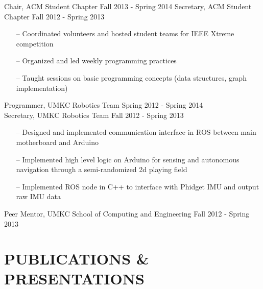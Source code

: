\documentclass[line,margin]{res}
\begin{document}
\begin{resume}
		
		
		Chair, ACM Student Chapter \hfill Fall 2013 - Spring 2014
		Secretary, ACM Student Chapter \hfill Fall 2012 - Spring 2013 
		         \begin{itemize} [leftmargin=5mm]  \itemsep -2pt %
                 \item[--] Coordinated volunteers and hosted student teams for IEEE Xtreme competition 
                 \item[--] Organized and led weekly programming practices
                 \item[--] Taught sessions on basic programming concepts (data structures, graph implementation)
                 \end{itemize} 

		
		Programmer, UMKC Robotics Team \hfill Spring 2012 - Spring 2014 \\
		Secretary, UMKC Robotics Team \hfill  Fall 2012 - Spring 2013 	
		\begin{itemize} [leftmargin=5mm]  \itemsep -2pt %
                 \item[--] Designed and implemented communication interface in ROS between main motherboard and Arduino 
		\item[--] Implemented high level logic on Arduino for sensing and autonomous navigation through a semi-randomized 2d playing field
                 \item[--] Implemented ROS node in C++ to interface with Phidget IMU and output raw IMU data

                 \end{itemize} 
		
		


		Peer Mentor, UMKC School of Computing and Engineering \hfill Fall 2012 - Spring 2013 

\section{PUBLICATIONS \& PRESENTATIONS }


\end{resume}
\end{document}
